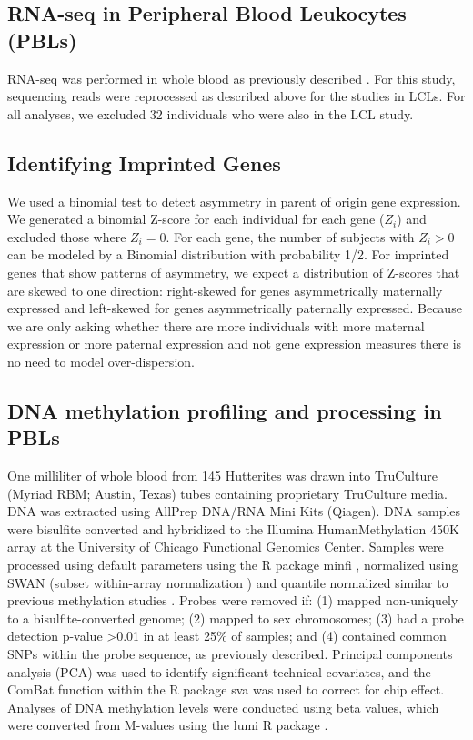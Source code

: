 \subsection{RNA-seq in Peripheral Blood Leukocytes (PBLs) }\label{RNA-seq in Peripheral Blood Leukocytes (PBLs) }
RNA-seq was performed in whole blood as previously described \citep{Stein:2016hn}. For this study, sequencing reads were reprocessed as described above for the studies in LCLs. For all analyses, we excluded 32 individuals who were also in the LCL study.

\subsection{Identifying Imprinted Genes}\label{Identifying Imprinted Genes}
We used a binomial test to detect asymmetry in parent of origin gene expression. We generated a binomial Z-score for each individual for each gene ($Z_i$) and excluded those where $Z_i =0$. For each gene, the number of subjects with $Z_i >0$ can be modeled by a Binomial distribution with probability 1/2. For imprinted genes that show patterns of asymmetry, we expect a distribution of Z-scores that are skewed to one direction: right-skewed for genes asymmetrically maternally expressed and left-skewed for genes asymmetrically paternally expressed. Because we are only asking whether there are more individuals with more maternal expression or more paternal expression and not gene expression measures there is no need to model over-dispersion.

\subsection{DNA methylation profiling and processing in PBLs}\label{DNA methylation profiling and processing in PBLs}
One milliliter of whole blood from 145 Hutterites was drawn into TruCulture (Myriad RBM; Austin, Texas) tubes containing proprietary TruCulture media. DNA was extracted using AllPrep DNA/RNA Mini Kits (Qiagen). DNA samples were bisulfite converted and hybridized to the Illumina HumanMethylation 450K array at the University of Chicago Functional Genomics Center.  Samples were processed using default parameters using the R package minfi \citep{Aryee:2014by}, normalized using SWAN (subset within-array normalization \citep{Maksimovic:2012ib}) and quantile normalized similar to previous methylation studies \citep{NicodemusJohnson:2016go}.  Probes were removed if: (1) mapped non-uniquely to a bisulfite-converted genome; (2) mapped to sex chromosomes; (3) had a probe detection p-value \textgreater0.01 in at least 25\% of samples; and (4) contained common SNPs within the probe sequence, as previously described\citep{Banovich:2014bn}. Principal components analysis (PCA) was used to identify significant technical covariates, and the ComBat function \citep{Johnson:2007fp} within the R package sva \citep{Leek:2012ee} was used to correct for chip effect. Analyses of DNA methylation levels were conducted using beta values, which were converted from M-values using the lumi R package \citep{Du:2008ev}.






